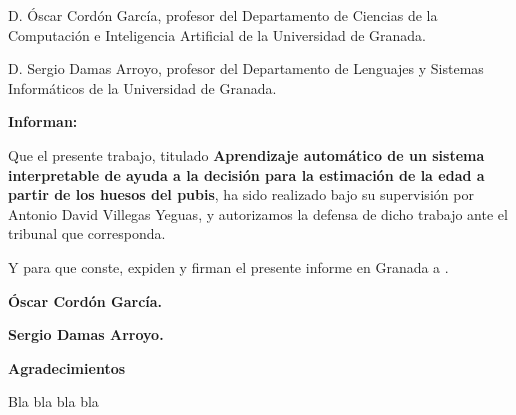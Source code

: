 D. Óscar Cordón García, profesor del Departamento de Ciencias de la Computación e Inteligencia Artificial de la Universidad de Granada.

\vspace{1cm}

D. Sergio Damas Arroyo, profesor del Departamento de Lenguajes y Sistemas Informáticos de la Universidad de Granada.

\vspace{1cm}

\textbf{Informan:}

\vspace{1cm}

Que el presente trabajo, titulado \textbf{Aprendizaje automático de un sistema interpretable de ayuda a la decisión para la estimación de la edad a partir de los huesos del pubis}, ha sido realizado bajo su supervisión por Antonio David Villegas Yeguas, y autorizamos la defensa de dicho trabajo ante el tribunal que corresponda.

\vspace{1cm}

Y para que conste, expiden y firman el presente informe en Granada a \thedate.

\vspace{5cm}

\textbf{Óscar Cordón García.}

\textbf{Sergio Damas Arroyo.}

\newpage

{\Large \textbf{Agradecimientos}}


Bla bla bla bla
